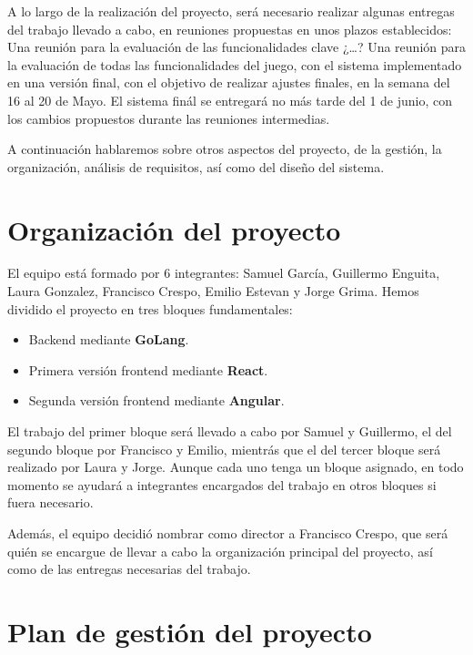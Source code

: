 \documentclass[12pt, a4paper, titlepage]{article}
\begin{document}
A lo largo de la realización del proyecto, será necesario realizar algunas entregas del trabajo llevado a cabo, en reuniones propuestas en unos plazos establecidos:\newline
Una reunión para la evaluación de las funcionalidades clave ¿…?\newline
Una reunión para la evaluación de todas las funcionalidades del juego, con el sistema implementado en una versión final, con el objetivo de realizar ajustes finales, en la semana del 16 al 20 de Mayo.\newline
El sistema finál se entregará no más tarde del 1 de junio, con los cambios propuestos durante las reuniones intermedias.

A continuación hablaremos sobre otros aspectos del proyecto, de la gestión, la organización, análisis de requisitos, así como del diseño del sistema.

\section{Organización del proyecto}
El equipo está formado por 6 integrantes: Samuel García, Guillermo Enguita, Laura Gonzalez, Francisco Crespo, Emilio Estevan y Jorge Grima.
Hemos dividido el proyecto en tres bloques fundamentales:
\begin{itemize}
    \item Backend mediante \textbf{GoLang}.
    \item Primera versión frontend mediante \textbf{React}.
    \item Segunda versión frontend mediante \textbf{Angular}.
\end{itemize}

El trabajo del primer bloque será llevado a cabo por Samuel y Guillermo, el del segundo bloque por Francisco y Emilio, mientrás que el del tercer bloque será realizado por Laura y Jorge. 
Aunque cada uno tenga un bloque asignado, en todo momento se ayudará a integrantes encargados del trabajo en otros bloques si fuera necesario.

Además, el equipo decidió nombrar como director a Francisco Crespo, que será quién se encargue de llevar a cabo la organización principal del proyecto, así como de las entregas necesarias del trabajo.

\section{Plan de gestión del proyecto}
\end{document}
